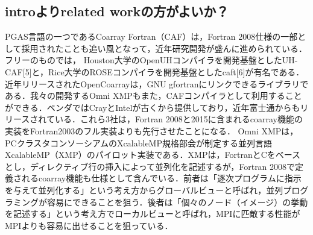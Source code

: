 \subsection{introよりrelated workの方がよいか？}



PGAS言語の一つであるCoarray Fortran（CAF）は，Fortran 2008仕様の一部として採用されたことも追い風となって，近年研究開発が盛んに進められている．フリーのものでは， Houston大学のOpenUHコンパイラを開発基盤としたUH-CAF[5]と，Rice大学のROSEコンパイラを開発基盤としたcaft[6]が有名である．近年リリースされたOpenCoarrayは，GNU gfortranにリンクできるライブラリである．我々の開発するOmni XMPもまた，CAFコンパイラとして利用することができる．ベンダではCrayとIntelが古くから提供しており，近年富士通からもリリースされている．これら3社は，Fortran 2008と2015に含まれるcoarray機能の実装をFortran2003のフル実装よりも先行させたことになる．
Omni XMPは，PCクラスタコンソーシアムのXcalableMP規格部会が制定する並列言語XcalableMP（XMP）のパイロット実装である．XMPは，FortranとCをベースとし，ディレクティブ行の挿入によって並列化を記述するが，Fortran 2008で定義されるcoarray機能も仕様として含んでいる．前者は「逐次プログラムに指示を与えて並列化する」という考え方からグローバルビューと呼ばれ，並列プログラミングが容易にできることを狙う．後者は「個々のノード（イメージ）の挙動を記述する」という考え方でローカルビューと呼ばれ，MPIに匹敵する性能がMPIよりも容易に出せることを狙っている．


